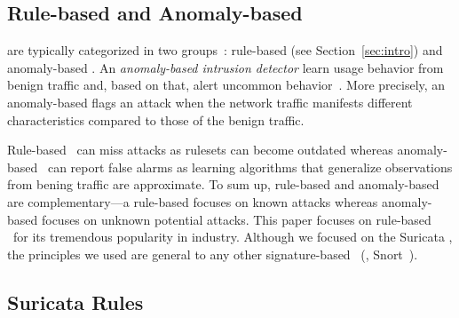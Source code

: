 \documentclass[sigconf,review, anonymous]{acmart}
\begin{document}
\subsection{Rule-based and Anomaly-based \nids}

\sloppy \nids{} are typically categorized in two
groups~\cite{kumar2007survey}: rule-based (see
Section~\ref{sec:intro}) and anomaly-based \nids. An
\emph{anomaly-based intrusion detector} learn usage behavior from
benign traffic and, based on that, alert uncommon
behavior~\cite{7579764,kumar2007survey,Mitchell:2014:SID:2597757.2542049,cordy-etal-issta19}. More
precisely, an anomaly-based \nids{} flags an attack when the network
traffic manifests different characteristics compared to those of the
benign traffic.

Rule-based \nids\ can miss attacks as rulesets can become outdated
whereas anomaly-based \nids\ can report false alarms as learning
algorithms that generalize observations from bening traffic are
approximate. To sum up, rule-based \nids{} and anomaly-based \nids{}
are complementary---a rule-based \nids{} focuses on known attacks
whereas anomaly-based \nids{} focuses on unknown potential attacks.
This paper focuses on rule-based \nids\ for its tremendous popularity
in industry. Although we focused on the Suricata \nids, the principles
we used are general to any other signature-based \nids~(\eg{},
Snort~\cite{snort}).


\subsection{Suricata Rules}
\label{sec:example-suricata-rules}
\end{document}
